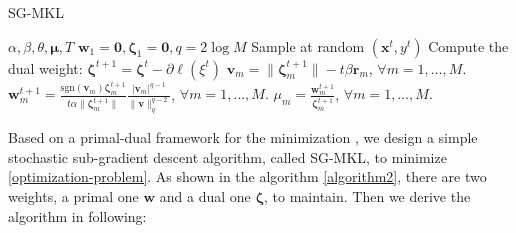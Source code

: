 \documentclass{article}
\begin{document}
\begin{algorithm}[h]
   \caption{SG-MKL}
   \label{algorithm2}
    \begin{algorithmic}
        $\alpha, \beta, \theta, \mathbf{\mu}, T$
        $\mathbf{w}_1=\mathbf{0}, \mathbf{\zeta}_1=\mathbf{0},q=2\log M $
       \STATE Sample at random $(\mathbf{x}^t, y^t)$
       \STATE Compute the dual weight: $\mathbf{\zeta}^{t+1}=\mathbf{\zeta}^t-\partial{\ell(\xi^t)}$
       \STATE $\mathbf{v}_m=\|\mathbf{\zeta}_m^{t+1}\|-t\beta\mathbf{r}_m$, $\forall m=1,\ldots, M.$
       \STATE $\mathbf{w}^{t+1}_m=\frac{\text{sgn}(\mathbf{v}_m) \mathbf{\zeta}_m^{t+1}}{t\alpha\|\mathbf{\zeta}_m^{t+1}\|}
       \frac{|\mathbf{v}_m|^{q-1}}{\|\mathbf{v}\|_q^{q-2}}$, $\forall m=1,\ldots, M.$
       \STATE $\mu_m=\frac{\mathbf{w}^{t+1}_m}{\mathbf{\zeta}^{t+1}_m}$, $\forall m=1,\ldots, M.$
       \ENDFOR
    \end{algorithmic}
\end{algorithm}
Based on a primal-dual framework for the minimization \cite{Shalev-ShwartzK08, Xiao10,OrabonaL11},
we design a simple stochastic sub-gradient descent algorithm, called SG-MKL, to minimize \eqref{optimization-problem}.
As shown in the algorithm \ref{algorithm2}, there are two weights, a primal one $\mathbf{w}$ and a dual one $\mathbf{\zeta}$, to maintain.
Then we derive the algorithm in following:
\end{document}
